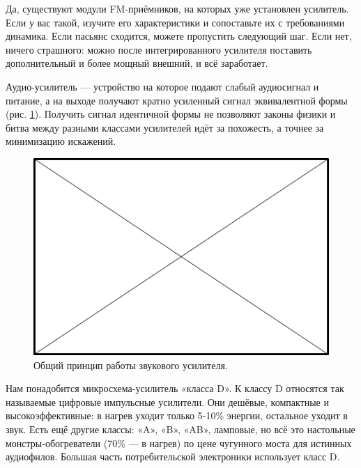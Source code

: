 \begin{Note}
  Да, существуют модули FM-приёмников, на которых уже установлен усилитель. Если у вас такой, изучите его характеристики и сопоставьте их с требованиями динамика. Если пасьянс сходится, можете пропустить следующий шаг. Если нет, ничего страшного: можно после интегрированного усилителя поставить дополнительный и более мощный внешний, и всё заработает.
\end{Note}

Аудио-усилитель — устройство на которое подают слабый аудиосигнал и питание, а на выходе получают кратно усиленный сигнал эквивалентной формы (рис. \ref{fig:sound-amp-diagram}). Получить сигнал идентичной формы не позволяют законы физики и битва между разными классами усилителей идёт за похожесть, а точнее за минимизацию искажений.

\begin{figure}
  \centering
  \includegraphics{TODO.png}
  \caption{Общий принцип работы звукового усилителя.}
  \label{fig:sound-amp-diagram}
\end{figure}

Нам понадобится микросхема-усилитель «класса D». К классу D относятся так называемые цифровые импульсные усилители. Они дешёвые, компактные и высокоэффективные: в нагрев уходит только 5-10\% энергии, остальное уходит в звук. Есть ещё другие классы: «A», «B», «AB», ламповые, но всё это настольные монстры-обогреватели (70\% — в нагрев) по цене чугунного моста для истинных аудиофилов. Большая часть потребительской электроники использует класс D.

